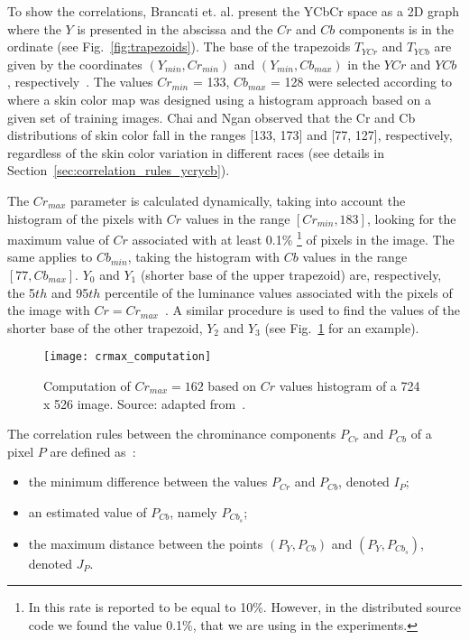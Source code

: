 To show the correlations, Brancati et. al. present the YCbCr space as a 2D graph where the $Y$ is presented in the abscissa and the $Cr$ and $Cb$ components is in the ordinate (see Fig.~\ref{fig:trapezoids}). The base of the trapezoids $T_{YCr}$ and $T_{YCb}$ are given by the coordinates $(Y_{min}, Cr_{min})$ and $(Y_{min}, Cb_{max})$ in the $YCr$ and $YCb$ , respectively~\citep{brancati:17}. The values $Cr_{min}$ = 133, $Cb_{max}$ = 128 were selected according to~\citet{chai:99} where a skin color map was designed using a histogram approach based on a given set of training images. Chai and Ngan observed that the Cr and Cb distributions of skin color fall in the ranges [133, 173] and [77, 127], respectively, regardless of the skin color variation in different races (see details in Section~\ref{sec:correlation_rules_ycrycb}).

The $Cr_{max}$ parameter is calculated dynamically, taking into account the histogram of the pixels with $Cr$ values in the range $[Cr_{min}, 183]$, looking for the maximum value of $Cr$ associated with at least 0.1\% \footnote{In \citet{brancati:17} this rate is reported to be equal to 10\%. However, in the distributed source code we found the value 0.1\%, that we are using in the experiments.} of pixels in the image. The same applies to $Cb_{min}$, taking the histogram with $Cb$ values in the range $[77, Cb_{max}]$. $Y_0$ and $Y_1$ (shorter base of the upper trapezoid) are, respectively, the 5${th}$ and 95$th$ percentile of the luminance values associated with the pixels of the image with $Cr = Cr_{max}$~\citep{brancati:17}. A similar procedure is used to find the values of the shorter base of the other trapezoid, $Y_2$ and $Y_3$ (see Fig.~\ref{fig:crmax_computation} for an example).

\begin{figure}[ht]
    \centering
    \texttt{[image: crmax\_computation]}
    \caption[Computation of $Cr_{max}$ based on $Cr$ values histogram of a 724 x 526 image]{Computation of $Cr_{max} = 162$ based on $Cr$ values histogram of a 724 x 526 image. Source: adapted from~\citep{brancati:17}.}
    \label{fig:crmax_computation}
\end{figure}

The correlation rules between the chrominance components $P_{Cr}$ and $P_{Cb}$ of a pixel $P$ are defined as~\citep{brancati:17}:
\begin{itemize}
    \item the minimum difference between the values $P_{Cr}$ and $P_{Cb}$, denoted $I_P$;
    \item an estimated value of $P_{Cb}$, namely $P_{Cb_s}$;
    \item the maximum distance between the points $(P_Y, P_{Cb})$ and $(P_Y, P_{Cb_s})$, denoted $J_P$.
\end{itemize}

